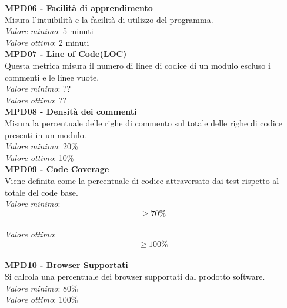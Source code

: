 \noindent\textbf{MPD06 - Facilità di apprendimento}\\
Misura l'intuibilità e la facilità di utilizzo del programma.\\
\textit{Valore minimo}: 5 minuti\\
\textit{Valore ottimo}: 2 minuti\\

\noindent\textbf{MPD07 - Line of Code(LOC)}\\
Questa metrica misura il numero di linee di codice di un modulo escluso i commenti e le linee vuote.\\
\textit{Valore minimo}: ??\\
\textit{Valore ottimo}: ??\\

\noindent\textbf{MPD08 - Densità dei commenti}\\
Misura la percentuale delle righe di commento sul totale delle righe di codice presenti in un modulo.\\
\textit{Valore minimo}: 20\%\\
\textit{Valore ottimo}: 10\%\\

\noindent\textbf{MPD09 - Code Coverage}\\
Viene definita come la percentuale di codice attraversato dai test rispetto al totale del code base.\\
\textit{Valore minimo}: $$ \geq 70\% $$\\
\textit{Valore ottimo}: $$ \geq 100\% $$\\

\noindent\textbf{MPD10 - Browser Supportati}\\
Si calcola una percentuale dei browser supportati dal prodotto software.\\	
\textit{Valore minimo}: 80\%\\
\textit{Valore ottimo}: 100\%\\
